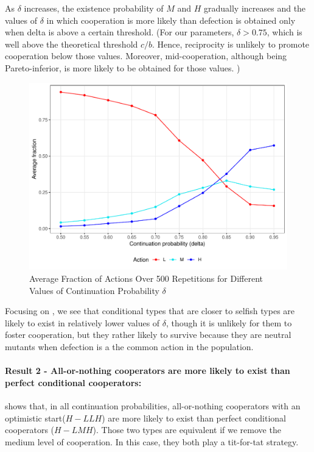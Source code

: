 \documentclass[12pt]{article}
\begin{document}
As $\delta$ increases, the existence probability of $M$ and $H$ gradually increases and the values of $\delta$ in which cooperation is more likely than defection is obtained only when delta is above a certain threshold. (For our parameters, $\delta > 0.75$, which is well above the theoretical threshold $c/b$. Hence, reciprocity is unlikely to promote cooperation below those values. Moreover, mid-cooperation, although being Pareto-inferior, is more likely to be obtained for those values. )

\begin{figure}[H]
	\centering
	\includegraphics[width=0.7\linewidth]{img/actions_over_delta}

	\caption[Average Fraction of Actions]{Average Fraction of Actions Over 500 Repetitions for Different Values of Continuation Probability $\delta$}

	\label{fig:evo-actionsdelta}
\end{figure}

Focusing on , we see that conditional types that are closer to selfish types are likely to exist in relatively lower values of $\delta$, though it is unlikely for them to foster cooperation, but they rather likely to survive because they are neutral mutants when defection is a the common action in the population. 



\paragraph{Result 2 - All-or-nothing cooperators are more likely to exist than perfect conditional cooperators: }

 shows that, in all continuation probabilities, all-or-nothing cooperators with an optimistic start($H-LLH$) are more likely to exist than perfect conditional cooperators ($H-LMH$). Those two types are equivalent if we remove the medium level of cooperation. In this case, they both play a tit-for-tat strategy. 
\end{document}
